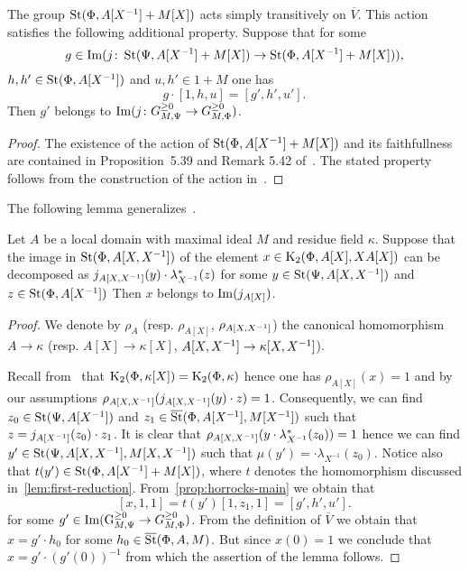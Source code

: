 \begin{prop} \label{prop:horrocks-main} The group $\operatorname{St}(\Phi, A[X^{-1}] + M[X])$ acts simply transitively on $\overline{V}$.
This action satisfies the following additional property.
Suppose that for some
\[g \in \operatorname{Im}(j\colon \operatorname{St}(\Psi, A[X^{-1}] + M[X]) \to \operatorname{St}(\Phi, A[X^{-1}] + M[X])), \]
$h, h' \in \operatorname{St}(\Phi, A[X^{-1}])$ and $u, h' \in 1 + M$ one has
\[ g \cdot [1, h, u] = [g', h', u'].\]
Then $g'$ belongs to $\operatorname{Im}(j\colon G_{M, \Psi}^{\geq 0} \to G_{M, \Phi}^{\geq 0})$.
\end{prop}
\begin{proof}
    The existence of the action of $\operatorname{St}(\Phi, A[X^{-1}] + M[X])$ and its faithfullness are contained in
    Proposition~5.39 and Remark 5.42 of~\cite{LS20}.
    The stated property follows from the construction of the action in~\cite[\S~5.4]{LS20}.
\end{proof}

The following lemma generalizes~\cite[Proposition~4.3(b)]{Tu83}.
\begin{lemma} \label{lem:horrocks-subsystem-local}
Let $A$ be a local domain with maximal ideal $M$ and residue field $\kappa$.
Suppose that the image in $\operatorname{St}(\Phi, A[X, X^{-1}])$ of the element $x \in \operatorname{K}_2(\Phi, A[X], XA[X])$
 can be decomposed as $j_{A[X, X^{-1}]}(y) \cdot \lambda_{X^{-1}}^*(z)$ for
 some $y \in \operatorname{St}(\Psi, A[X, X^{-1}])$ and $z \in \operatorname{St}(\Phi, A[X^{-1}])$
Then $x$ belongs to $\operatorname{Im}(j_{A[X]})$.
\end{lemma}
\begin{proof}
    We denote by $\rho_{A}$ (resp. $\rho_{A[X]}$, $\rho_{A[X, X^{-1}]}$) the canonical homomorphism
     $A \to \kappa$ (resp. $A[X] \to \kappa[X]$, $A[X, X^{-1}] \to \kappa[X, X^{-1}]$).

    Recall from~\cite{Hur77} that $\operatorname{K}_2(\Phi, \kappa[X]) = \operatorname{K}_2(\Phi, \kappa)$ hence one has $\rho_{A[X]}(x) = 1$
     and by our assumptions $\rho_{A[X, X^{-1}]}(j_{A[X, X^{-1}]}(y) \cdot z) = 1$.
    Consequently, we can find $z_0 \in \operatorname{St}(\Psi, A[X^{-1}])$ and $z_1 \in \overline{\operatorname{St}}(\Phi, A[X^{-1}], M[X^{-1}])$
     such that $z = j_{A[X^{-1}]}(z_0) \cdot z_1$.
    It is clear that $\rho_{A[X, X^{-1}]}(y \cdot \lambda_{X^{-1}}^*(z_0)) = 1$ hence we can find
     $y' \in \operatorname{St}(\Psi, A[X, X^{-1}], M[X, X^{-1}])$ such that $\mu(y') = \cdot \lambda_{X^{-1}}(z_0)$.
    Notice also that $t(y') \in \operatorname{St}(\Phi, A[X^{-1}] + M[X])$, where $t$ denotes the homomorphism discussed in~\cref{lem:first-reduction}.
    From~\cref{prop:horrocks-main} we obtain that
    \[ [x, 1, 1 ] = t(y') [1, z_1, 1] = [g', h', u']. \]
    for some $g' \in \operatorname{Im}(\operatorname{G}_{M, \Psi}^{\geq 0} \to G_{M, \Phi}^{\geq 0})$.
    From the definition of $\overline{V}$ we obtain that $x = g' \cdot h_0$ for some $h_0 \in \overline{\operatorname{St}}(\Phi, A, M)$.
    But since $x(0) = 1$ we conclude that $x = g' \cdot (g'(0))^{-1}$ from which the assertion of the lemma follows.
\end{proof}

